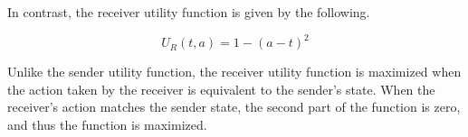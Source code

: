 \documentclass[12pt]{upenndiss}
\theoremstyle{definition} \newtheorem{definition}{Definition}
\begin{document}
In contrast, the receiver utility function is given by the following. 

\begin{equation}
     U_R(t, a) = 1 - (a - t)^2
\end{equation}

Unlike the sender utility function, the receiver utility function is maximized when the action taken by the receiver is equivalent to the sender's state. When the receiver's action matches the sender state, the second part of the function is zero, and thus the function is maximized.

%
\end{document}
